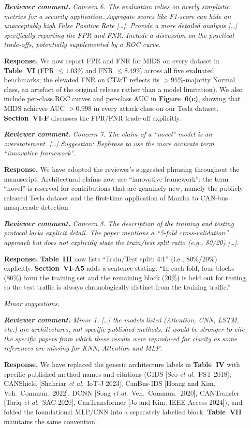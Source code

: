 \documentclass[11pt,a4paper]{article}
\newcommand{\rcomment}[1]{%
  \par\medskip
  \begingroup
  \itshape
  \textbf{Reviewer comment.}\,\,#1
  \endgroup
  \par
}
\newcommand{\rresponse}[1]{%
  \par
  \begingroup
  \color{NavyBlue}
  \textbf{Response.}\,\,#1
  \endgroup
  \par\medskip
}
\newcommand{\xref}[1]{\textbf{#1}}
\begin{document}
\rcomment{Concern 6. The evaluation relies on overly simplistic
metrics for a security application. Aggregate scores like F1-score
can hide an unacceptably high False Positive Rate [\dots]. Provide
a more detailed analysis [\dots] specifically reporting the FPR
and FNR. Include a discussion on the practical trade-offs,
potentially supplemented by a ROC curve.}
\rresponse{We now report FPR and FNR for MIDS on every dataset in
\xref{Table~VI} (FPR $\le 1.03\%$ and FNR $\le 8.49\%$ across all
five evaluated benchmarks; the elevated FNR on CT\&T reflects its
$>95\%$-majority Normal class, an artefact of the original
release rather than a model limitation). We also include per-class
ROC curves and per-class AUC in \xref{Figure~6(c)}, showing that
MIDS achieves AUC $> 0.998$ in every attack class on our Tesla
dataset. \xref{Section~VI-F} discusses the FPR/FNR trade-off
explicitly.}

\rcomment{Concern 7. The claim of a ``novel'' model is an
overstatement. [\dots] Suggestion: Rephrase to use the more
accurate term ``innovative framework''.}
\rresponse{We have adopted the reviewer's suggested phrasing
throughout the manuscript. Architectural claims now use
``innovative framework''; the term ``novel'' is reserved for
contributions that are genuinely new, namely the publicly
released Tesla dataset and the first-time application of Mamba
to CAN-bus masquerade detection.}

\rcomment{Concern 8. The description of the training and testing
protocol lacks explicit detail. The paper mentions a ``5-fold
cross-validation'' approach but does not explicitly state the
train/test split ratio (e.g., 80/20) [\dots].}
\rresponse{\xref{Table~III} now lists ``Train/Test split: 4{:}1''
(i.e., 80\%/20\%) explicitly. \xref{Section~VI-A5} adds a sentence
stating: ``In each fold, four blocks (80\%) form the training set
and the remaining block (20\%) is held out for testing, so the
test traffic is always chronologically distinct from the training
traffic.''}

\medskip
\noindent\textit{Minor suggestions.}

\rcomment{Minor 1. [\dots] the models listed (Attention, CNN,
LSTM, etc.) are architectures, not specific published methods.
It would be stronger to cite the specific papers from which these
results were reproduced for clarity as some references are missing
for KNN, Attention and MLP.}
\rresponse{We have replaced the generic architecture labels in
\xref{Table~IV} with specific published method names and
citations (GIDS [Seo \textit{et al.}\ PST 2018],
CANShield [Shahriar \textit{et al.}\ IoT-J 2023],
CanBus-IDS [Hoang and Kim, Veh.\ Commun.\ 2022],
DCNN [Song \textit{et al.}\ Veh.\ Commun.\ 2020],
CANTransfer [Tariq \textit{et al.}\ SAC 2020],
CanTransformer [Jo and Kim, IEEE Access 2024]),
and folded the foundational MLP/CNN
into a separately labelled block. \xref{Table~VII} maintains the
same convention.}
\end{document}
